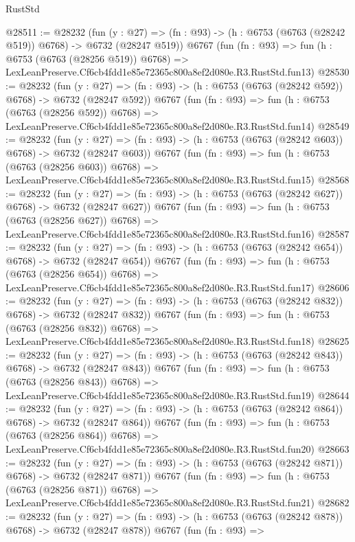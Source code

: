 \begin{lexlean}{RustStd}
\begin{coremodule}
@28511 := @28232
    (fun (y : @27) => (fn : @93) -> (h : @6753 (@6763 (@28242 @519)) @6768) -> @6732 (@28247 @519))
    @6767
    (fun (fn : @93) =>
    fun (h : @6753 (@6763 (@28256 @519)) @6768) =>
    LexLeanPreserve.Cf6cb4fdd1e85e72365c800a8ef2d080e.R3.RustStd.fun13)
@28530 := @28232
    (fun (y : @27) => (fn : @93) -> (h : @6753 (@6763 (@28242 @592)) @6768) -> @6732 (@28247 @592))
    @6767
    (fun (fn : @93) =>
    fun (h : @6753 (@6763 (@28256 @592)) @6768) =>
    LexLeanPreserve.Cf6cb4fdd1e85e72365c800a8ef2d080e.R3.RustStd.fun14)
@28549 := @28232
    (fun (y : @27) => (fn : @93) -> (h : @6753 (@6763 (@28242 @603)) @6768) -> @6732 (@28247 @603))
    @6767
    (fun (fn : @93) =>
    fun (h : @6753 (@6763 (@28256 @603)) @6768) =>
    LexLeanPreserve.Cf6cb4fdd1e85e72365c800a8ef2d080e.R3.RustStd.fun15)
@28568 := @28232
    (fun (y : @27) => (fn : @93) -> (h : @6753 (@6763 (@28242 @627)) @6768) -> @6732 (@28247 @627))
    @6767
    (fun (fn : @93) =>
    fun (h : @6753 (@6763 (@28256 @627)) @6768) =>
    LexLeanPreserve.Cf6cb4fdd1e85e72365c800a8ef2d080e.R3.RustStd.fun16)
@28587 := @28232
    (fun (y : @27) => (fn : @93) -> (h : @6753 (@6763 (@28242 @654)) @6768) -> @6732 (@28247 @654))
    @6767
    (fun (fn : @93) =>
    fun (h : @6753 (@6763 (@28256 @654)) @6768) =>
    LexLeanPreserve.Cf6cb4fdd1e85e72365c800a8ef2d080e.R3.RustStd.fun17)
@28606 := @28232
    (fun (y : @27) => (fn : @93) -> (h : @6753 (@6763 (@28242 @832)) @6768) -> @6732 (@28247 @832))
    @6767
    (fun (fn : @93) =>
    fun (h : @6753 (@6763 (@28256 @832)) @6768) =>
    LexLeanPreserve.Cf6cb4fdd1e85e72365c800a8ef2d080e.R3.RustStd.fun18)
@28625 := @28232
    (fun (y : @27) => (fn : @93) -> (h : @6753 (@6763 (@28242 @843)) @6768) -> @6732 (@28247 @843))
    @6767
    (fun (fn : @93) =>
    fun (h : @6753 (@6763 (@28256 @843)) @6768) =>
    LexLeanPreserve.Cf6cb4fdd1e85e72365c800a8ef2d080e.R3.RustStd.fun19)
@28644 := @28232
    (fun (y : @27) => (fn : @93) -> (h : @6753 (@6763 (@28242 @864)) @6768) -> @6732 (@28247 @864))
    @6767
    (fun (fn : @93) =>
    fun (h : @6753 (@6763 (@28256 @864)) @6768) =>
    LexLeanPreserve.Cf6cb4fdd1e85e72365c800a8ef2d080e.R3.RustStd.fun20)
@28663 := @28232
    (fun (y : @27) => (fn : @93) -> (h : @6753 (@6763 (@28242 @871)) @6768) -> @6732 (@28247 @871))
    @6767
    (fun (fn : @93) =>
    fun (h : @6753 (@6763 (@28256 @871)) @6768) =>
    LexLeanPreserve.Cf6cb4fdd1e85e72365c800a8ef2d080e.R3.RustStd.fun21)
@28682 := @28232
    (fun (y : @27) => (fn : @93) -> (h : @6753 (@6763 (@28242 @878)) @6768) -> @6732 (@28247 @878))
    @6767
    (fun (fn : @93) =>

\end{coremodule}
\end{lexlean}
